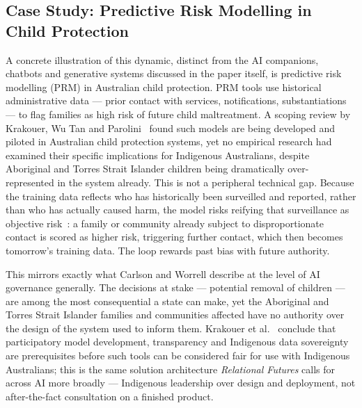 \subsection{Case Study: Predictive Risk Modelling in Child Protection}

A concrete illustration of this dynamic, distinct from the AI companions, chatbots and generative
systems discussed in the paper itself, is predictive risk modelling (PRM) in Australian child
protection. PRM tools use historical administrative data --- prior contact with services,
notifications, substantiations --- to flag families as high risk of future child maltreatment. A
scoping review by Krakouer, Wu Tan and Parolini~\cite{krakouer2021analysing} found such models are
being developed and piloted in Australian child protection systems, yet no empirical research had
examined their specific implications for Indigenous Australians, despite Aboriginal and Torres
Strait Islander children being dramatically over-represented in the system already. This is not a
peripheral technical gap. Because the training data reflects who has historically been surveilled
and reported, rather than who has actually caused harm, the model risks reifying that surveillance
as objective risk~\cite{keddell2015ethics}: a family or community already subject to
disproportionate contact is scored as higher risk, triggering further contact, which then becomes
tomorrow's training data. The loop rewards past bias with future authority.

This mirrors exactly what Carlson and Worrell describe at the level of AI governance generally. The
decisions at stake --- potential removal of children --- are among the most consequential a state
can make, yet the Aboriginal and Torres Strait Islander families and communities affected have no
authority over the design of the system used to inform them. Krakouer et
al.~\cite{krakouer2021analysing} conclude that participatory model development, transparency and
Indigenous data sovereignty are prerequisites before such tools can be considered fair for use with
Indigenous Australians; this is the same solution architecture \emph{Relational Futures} calls for
across AI more broadly --- Indigenous leadership over design and deployment, not after-the-fact
consultation on a finished product.

